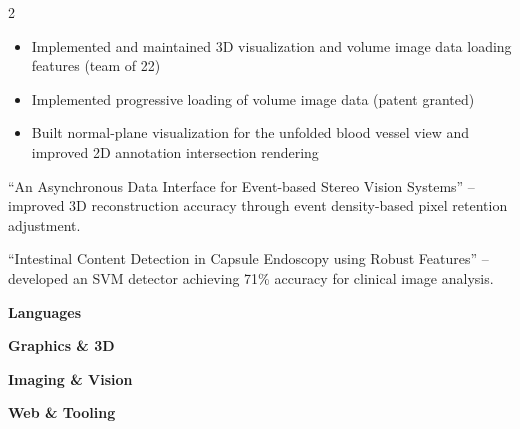 \documentclass[10pt,a4paper,withhyper]{altacv}
\begin{document}
\begin{paracol}{2}
\divider

\begin{itemize}
\item Implemented and maintained 3D visualization and volume image data loading features (team of 22)
\item Implemented progressive loading of volume image data (patent granted)
\item Built normal-plane visualization for the unfolded blood vessel view and improved 2D annotation intersection rendering
\end{itemize}


``An Asynchronous Data Interface for Event-based Stereo Vision Systems'' -- improved 3D reconstruction accuracy through event density-based pixel retention adjustment.

\divider

``Intestinal Content Detection in Capsule Endoscopy using Robust Features'' -- developed an SVM detector achieving 71\% accuracy for clinical image analysis.

\switchcolumn


{\small\textbf{Languages}}\smallskip\par
{}

\divider\smallskip

{\small\textbf{Graphics \& 3D}}\smallskip\par
{}

\divider\smallskip

{\small\textbf{Imaging \& Vision}}\smallskip\par
{}

\divider\smallskip

{\small\textbf{Web \& Tooling}}\smallskip\par
{}

\medskip


\end{paracol}
\end{document}
